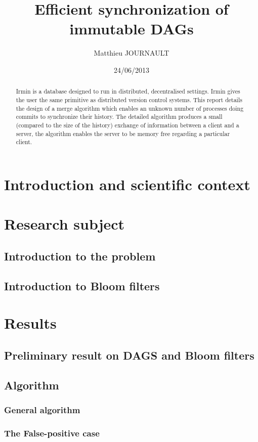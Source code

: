 \documentclass[a4paper,10pt]{report}
\title{Efficient synchronization of immutable DAGs}
\author{Matthieu JOURNAULT}
\date{24/06/2013}
\theoremstyle{definition}
\theoremstyle{definition}
\begin{document}
\maketitle
\begin{abstract}
Irmin is a database designed to run in distributed, decentralised settings. Irmin gives the user the same primitive as distributed version control systems. This report details the design of a merge algorithm which enables an unknown number of processes doing commits to synchronize their history. The detailed algorithm produces a small (compared to the size of the history) exchange of information between a client and a server, the algorithm enables the server to be memory free regarding a particular client.
\end{abstract}
\tableofcontents
% 
\chapter{Introduction and scientific context}
\chapter{Research subject}
\section{Introduction to the problem}

\section{Introduction to Bloom filters}

\chapter{Results}
\section{Preliminary result on DAGS and Bloom filters}
\label{sec:prelim}

\section{Algorithm}
\subsection{General algorithm}

\subsection{The False-positive case}
\label{sec:fp}

\end{document}
